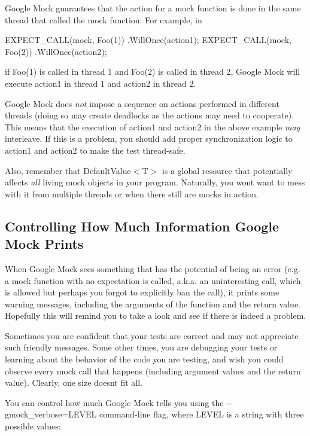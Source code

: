 Google Mock guarantees that the action for a mock function is done in the same thread that called the mock function. For example, in


\begin{DoxyCode}
EXPECT\_CALL(mock, Foo(1))
    .WillOnce(action1);
EXPECT\_CALL(mock, Foo(2))
    .WillOnce(action2);
\end{DoxyCode}


if {\ttfamily Foo(1)} is called in thread 1 and {\ttfamily Foo(2)} is called in thread 2, Google Mock will execute {\ttfamily action1} in thread 1 and {\ttfamily action2} in thread 2.

Google Mock does {\itshape not} impose a sequence on actions performed in different threads (doing so may create deadlocks as the actions may need to cooperate). This means that the execution of {\ttfamily action1} and {\ttfamily action2} in the above example {\itshape may} interleave. If this is a problem, you should add proper synchronization logic to {\ttfamily action1} and {\ttfamily action2} to make the test thread-\/safe.

Also, remember that {\ttfamily Default\+Value$<$T$>$} is a global resource that potentially affects {\itshape all} living mock objects in your program. Naturally, you won\textquotesingle{}t want to mess with it from multiple threads or when there still are mocks in action.

\subsection*{Controlling How Much Information Google Mock Prints}

When Google Mock sees something that has the potential of being an error (e.\+g. a mock function with no expectation is called, a.\+k.\+a. an uninteresting call, which is allowed but perhaps you forgot to explicitly ban the call), it prints some warning messages, including the arguments of the function and the return value. Hopefully this will remind you to take a look and see if there is indeed a problem.

Sometimes you are confident that your tests are correct and may not appreciate such friendly messages. Some other times, you are debugging your tests or learning about the behavior of the code you are testing, and wish you could observe every mock call that happens (including argument values and the return value). Clearly, one size doesn\textquotesingle{}t fit all.

You can control how much Google Mock tells you using the {\ttfamily -\/-\/gmock\+\_\+verbose=L\+E\+V\+EL} command-\/line flag, where {\ttfamily L\+E\+V\+EL} is a string with three possible values\+:


